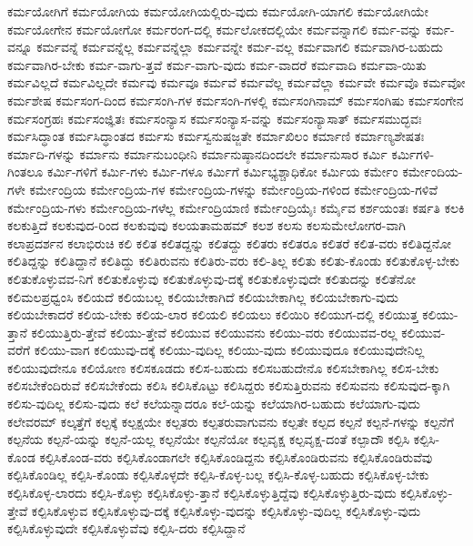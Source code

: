 {ಕರ್ಮಯೋಗಿಗೆ
ಕರ್ಮಯೋಗಿಯ
ಕರ್ಮಯೋಗಿಯಲ್ಲಿರು-ವುದು
ಕರ್ಮಯೋಗಿ-ಯಾಗಲಿ
ಕರ್ಮಯೋಗಿಯೇ
ಕರ್ಮಯೋಗೇನ
ಕರ್ಮಯೋಗೋ
ಕರ್ಮರಂಗ-ದಲ್ಲಿ
ಕರ್ಮಲೋಕದಲ್ಲಿಯೇ
ಕರ್ಮವನ್ನಾಗಲಿ
ಕರ್ಮ-ವನ್ನು
ಕರ್ಮ-ವನ್ನೂ
ಕರ್ಮವನ್ನೆ
ಕರ್ಮವನ್ನೆಲ್ಲ
ಕರ್ಮವನ್ನೆಲ್ಲಾ
ಕರ್ಮವನ್ನೇ
ಕರ್ಮ-ವಲ್ಲ
ಕರ್ಮವಾಗಲಿ
ಕರ್ಮವಾಗಿರ-ಬಹುದು
ಕರ್ಮವಾಗಿರ-ಬೇಕು
ಕರ್ಮ-ವಾಗು-ತ್ತವೆ
ಕರ್ಮ-ವಾಗು-ವುದು
ಕರ್ಮ-ವಾದರೆ
ಕರ್ಮವಾದಿ
ಕರ್ಮವಾ-ಯಿತು
ಕರ್ಮವಿಲ್ಲದೆ
ಕರ್ಮವಿಲ್ಲದೇ
ಕರ್ಮವು
ಕರ್ಮವೂ
ಕರ್ಮವೆ
ಕರ್ಮವೆಲ್ಲ
ಕರ್ಮವೆಲ್ಲಾ
ಕರ್ಮವೇ
ಕರ್ಮವೊ
ಕರ್ಮವೋ
ಕರ್ಮಶೇಷ
ಕರ್ಮಸಂಗ-ದಿಂದ
ಕರ್ಮಸಂಗಿ-ಗಳ
ಕರ್ಮಸಂಗಿ-ಗಳಲ್ಲಿ
ಕರ್ಮಸಂಗಿನಾಮ್
ಕರ್ಮಸಂಗಿಷು
ಕರ್ಮಸಂಗೇನ
ಕರ್ಮಸಂಗ್ರಹಃ
ಕರ್ಮಸಂಜ್ಞಿತಃ
ಕರ್ಮಸಂನ್ಯಾಸ
ಕರ್ಮಸಂನ್ಯಾಸ-ವನ್ನು
ಕರ್ಮಸಂನ್ಯಾಸಾತ್
ಕರ್ಮಸಮುದ್ಭವಃ
ಕರ್ಮಸಿದ್ಧಾಂತ
ಕರ್ಮಸಿದ್ಧಾಂತದ
ಕರ್ಮಸು
ಕರ್ಮಸ್ವನುಷಜ್ಜತೇ
ಕರ್ಮಾಖಿಲಂ
ಕರ್ಮಾಣಿ
ಕರ್ಮಾಣ್ಯಶೇಷತಃ
ಕರ್ಮಾದಿ-ಗಳನ್ನು
ಕರ್ಮಾನು
ಕರ್ಮಾನುಬಂಧೀನಿ
ಕರ್ಮಾನುಷ್ಠಾನದಿಂದಲೇ
ಕರ್ಮಾನುಸಾರ
ಕರ್ಮಿ
ಕರ್ಮಿಗಳಿ-ಗಿಂತಲೂ
ಕರ್ಮಿ-ಗಳಿಗೆ
ಕರ್ಮಿ-ಗಳು
ಕರ್ಮಿ-ಗಳೂ
ಕರ್ಮಿಗೆ
ಕರ್ಮಿಭ್ಯಶ್ಚಾಧಿಕೋ
ಕರ್ಮಿಯ
ಕರ್ಮೇಂ
ಕರ್ಮೇಂದಿಯ-ಗಳೇ
ಕರ್ಮೇಂದ್ರಿಯ
ಕರ್ಮೇಂದ್ರಿಯ-ಗಳ
ಕರ್ಮೇಂದ್ರಿಯ-ಗಳನ್ನು
ಕರ್ಮೇಂದ್ರಿಯ-ಗಳಿಂದ
ಕರ್ಮೇಂದ್ರಿಯ-ಗಳಿವೆ
ಕರ್ಮೇಂದ್ರಿಯ-ಗಳು
ಕರ್ಮೇಂದ್ರಿಯ-ಗಳೆಲ್ಲ
ಕರ್ಮೇಂದ್ರಿಯಾಣಿ
ಕರ್ಮೇಂದ್ರಿಯೈಃ
ಕರ್ಮೈವ
ಕರ್ಶಯಂತಃ
ಕರ್ಷತಿ
ಕಲಕಿ
ಕಲಕುತ್ತಿದೆ
ಕಲಕುವುದ-ರಿಂದ
ಕಲಕುವುವು
ಕಲಯತಾಮಹಮ್
ಕಲಶ
ಕಲಸು
ಕಲಸುಮೇಲೋಗರ-ವಾಗಿ
ಕಲಾಪ್ರದರ್ಶನ
ಕಲಾಭಿರುಚಿ
ಕಲಿ
ಕಲಿತ
ಕಲಿತದ್ದನ್ನು
ಕಲಿತದ್ದು
ಕಲಿತರು
ಕಲಿತರೂ
ಕಲಿತರೆ
ಕಲಿತ-ವರು
ಕಲಿತಿದ್ದನೋ
ಕಲಿತಿದ್ದನ್ನು
ಕಲಿತಿದ್ದಾನೆ
ಕಲಿತಿದ್ದು
ಕಲಿತಿರುವನು
ಕಲಿತಿರು-ವರು
ಕಲಿ-ತಿಲ್ಲ
ಕಲಿತು
ಕಲಿತು-ಕೊಂಡು
ಕಲಿತುಕೊಳ್ಳ-ಬೇಕು
ಕಲಿತುಕೊಳ್ಳುವವ-ನಿಗೆ
ಕಲಿತುಕೊಳ್ಳುವು
ಕಲಿತುಕೊಳ್ಳುವು-ದಕ್ಕೆ
ಕಲಿತುಕೊಳ್ಳುವುದೇ
ಕಲಿತುದನ್ನು
ಕಲಿತೆನೋ
ಕಲಿಮಲಪ್ರಧ್ವಂಸಿ
ಕಲಿಯದೆ
ಕಲಿಯಬಲ್ಲ
ಕಲಿಯಬೇಕಾಗಿದೆ
ಕಲಿಯಬೇಕಾಗಿಲ್ಲ
ಕಲಿಯಬೇಕಾಗು-ವುದು
ಕಲಿಯಬೇಕಾದರೆ
ಕಲಿಯ-ಬೇಕು
ಕಲಿಯ-ಲಾರ
ಕಲಿಯಲಿ
ಕಲಿಯಲು
ಕಲಿಯಿರಿ
ಕಲಿಯುಗ-ದಲ್ಲಿ
ಕಲಿಯುತ್ತ
ಕಲಿಯು-ತ್ತಾನೆ
ಕಲಿಯುತ್ತಿರು-ತ್ತೇವೆ
ಕಲಿಯು-ತ್ತೇವೆ
ಕಲಿಯುವ
ಕಲಿಯುವನು
ಕಲಿಯು-ವರು
ಕಲಿಯುವವ-ರಲ್ಲ
ಕಲಿಯುವ-ವರೆಗೆ
ಕಲಿಯು-ವಾಗ
ಕಲಿಯುವು-ದಕ್ಕೆ
ಕಲಿಯು-ವುದಿಲ್ಲ
ಕಲಿಯು-ವುದು
ಕಲಿಯುವುದೂ
ಕಲಿಯುವುದೇನಿಲ್ಲ
ಕಲಿಯುವುದೇನೂ
ಕಲಿಯೋಣ
ಕಲಿಸಕೂಡದು
ಕಲಿಸ-ಬಹುದು
ಕಲಿಸಬಹುದೇನೊ
ಕಲಿಸಬೇಕಾಗಿಲ್ಲ
ಕಲಿಸ-ಬೇಕು
ಕಲಿಸಬೇಕೆಂದಿರುವೆ
ಕಲಿಸಬೇಕೆಂದು
ಕಲಿಸಿ
ಕಲಿಸಿಕೊಟ್ಟು
ಕಲಿಸಿದ್ದರು
ಕಲಿಸುತ್ತಿರುವನು
ಕಲಿಸುವನು
ಕಲಿಸುವುದ-ಕ್ಕಾಗಿ
ಕಲಿಸು-ವುದಿಲ್ಲ
ಕಲಿಸು-ವುದು
ಕಲೆ
ಕಲೆಯನ್ನಾದರೂ
ಕಲೆ-ಯನ್ನು
ಕಲೆಯಾಗಿರ-ಬಹುದು
ಕಲೆಯಾಗು-ವುದು
ಕಲೇವರಮ್
ಕಲ್ಕತ್ತೆಗೆ
ಕಲ್ಪಕ್ಕೆ
ಕಲ್ಪಕ್ಷಯೇ
ಕಲ್ಪತರು
ಕಲ್ಪತರುವಾಗುವನು
ಕಲ್ಪತೇ
ಕಲ್ಪದ
ಕಲ್ಪನೆ
ಕಲ್ಪನೆ-ಗಳನ್ನು
ಕಲ್ಪನೆಗೆ
ಕಲ್ಪನೆಯ
ಕಲ್ಪನೆ-ಯನ್ನು
ಕಲ್ಪನೆ-ಯಲ್ಲ
ಕಲ್ಪನೆಯೇ
ಕಲ್ಪನೆಯೋ
ಕಲ್ಪವೃಕ್ಷ
ಕಲ್ಪವೃಕ್ಷ-ದಂತೆ
ಕಲ್ಪಾದೌ
ಕಲ್ಪಿಸಿ
ಕಲ್ಪಿಸಿ-ಕೊಂಡ
ಕಲ್ಪಿಸಿಕೊಂಡ-ವರು
ಕಲ್ಪಿಸಿಕೊಂಡಾಗಲೇ
ಕಲ್ಪಿಸಿಕೊಂಡಿದ್ದನು
ಕಲ್ಪಿಸಿಕೊಂಡಿರುವನು
ಕಲ್ಪಿಸಿಕೊಂಡಿರುವೆವು
ಕಲ್ಪಿಸಿಕೊಂಡಿಲ್ಲ
ಕಲ್ಪಿಸಿ-ಕೊಂಡು
ಕಲ್ಪಿಸಿಕೊಳ್ಳದೇ
ಕಲ್ಪಿಸಿ-ಕೊಳ್ಳ-ಬಲ್ಲ
ಕಲ್ಪಿಸಿ-ಕೊಳ್ಳ-ಬಹುದು
ಕಲ್ಪಿಸಿಕೊಳ್ಳ-ಬೇಕು
ಕಲ್ಪಿಸಿಕೊಳ್ಳ-ಲಾರದು
ಕಲ್ಪಿಸಿ-ಕೊಳ್ಳು
ಕಲ್ಪಿಸಿಕೊಳ್ಳು-ತ್ತಾನೆ
ಕಲ್ಪಿಸಿಕೊಳ್ಳುತ್ತಿದ್ದೆವು
ಕಲ್ಪಿಸಿಕೊಳ್ಳುತ್ತಿರು-ವುದು
ಕಲ್ಪಿಸಿಕೊಳ್ಳು-ತ್ತೇವೆ
ಕಲ್ಪಿಸಿಕೊಳ್ಳುವ
ಕಲ್ಪಿಸಿಕೊಳ್ಳುವು-ದಕ್ಕೆ
ಕಲ್ಪಿಸಿಕೊಳ್ಳು-ವುದನ್ನು
ಕಲ್ಪಿಸಿಕೊಳ್ಳು-ವುದಿಲ್ಲ
ಕಲ್ಪಿಸಿಕೊಳ್ಳು-ವುದು
ಕಲ್ಪಿಸಿಕೊಳ್ಳುವುದೇ
ಕಲ್ಪಿಸಿಕೊಳ್ಳುವೆವು
ಕಲ್ಪಿಸಿ-ದರು
ಕಲ್ಪಿಸಿದ್ದಾನೆ
}

